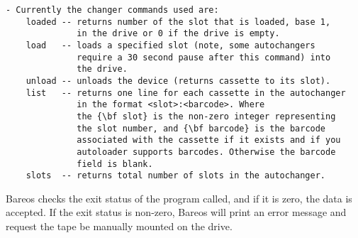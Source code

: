 \footnotesize
\begin{verbatim}
- Currently the changer commands used are:
    loaded -- returns number of the slot that is loaded, base 1,
              in the drive or 0 if the drive is empty.
    load   -- loads a specified slot (note, some autochangers
              require a 30 second pause after this command) into
              the drive.
    unload -- unloads the device (returns cassette to its slot).
    list   -- returns one line for each cassette in the autochanger
              in the format <slot>:<barcode>. Where
              the {\bf slot} is the non-zero integer representing
              the slot number, and {\bf barcode} is the barcode
              associated with the cassette if it exists and if you
              autoloader supports barcodes. Otherwise the barcode
              field is blank.
    slots  -- returns total number of slots in the autochanger.
\end{verbatim}
\normalsize

Bareos checks the exit status of the program called, and if it is zero, the
data is accepted. If the exit status is non-zero, Bareos will print an
error message and request the tape be manually mounted on the drive.
